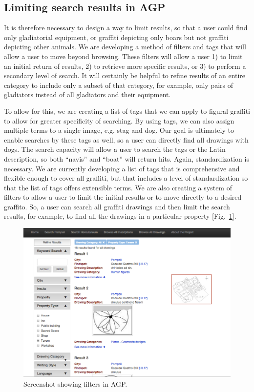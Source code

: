 \documentclass[amsthm,ebook]{saparticle}
\begin{document}
\subsection{Limiting search results in AGP}


\noindent It is therefore necessary to design a way to limit results, so that a user could find only gladiatorial equipment,
or graffiti depicting only boars but not graffiti depicting other animals. We are developing a method of filters and
tags that will allow a user to move beyond browsing. These filters will allow a user 1) to limit an initial return of
results, 2) to retrieve more specific results, or 3) to perform a secondary level of search. It will certainly be
helpful to refine results of an entire category to include only a subset of that category, for example, only pairs of
gladiators instead of all gladiators and their equipment.

To allow for this, we are creating a list of tags that we can apply to figural graffiti to allow for greater specificity
of searching. By using tags, we can also assign multiple terms to a single image, e.g. stag and dog. Our goal is
ultimately to enable searches by these tags as well, so a user can directly find all drawings with dogs. The search
capacity will allow a user to search the tags or the Latin description, so both ``navis'' and ``boat'' will return hits.
Again, standardization is necessary. We are currently developing a list of tags that is comprehensive and flexible
enough to cover all graffiti, but that includes a level of standardization so that the list of tags offers extensible
terms. We are also creating a system of filters to allow a user to limit the initial results or to move directly to a
desired graffito. So, a user can search all graffiti drawings and then limit the search results, for example, to find
all the drawings in a particular property [Fig.~\ref{fig:9}].



\begin{figure}[!bp]
\centering
 \includegraphics[width=\columnwidth]{EAGLE2016BenefielSypniewski-img009.png}
\caption{Screenshot showing filters in AGP.}
\label{fig:9}
\end{figure}
\end{document}
